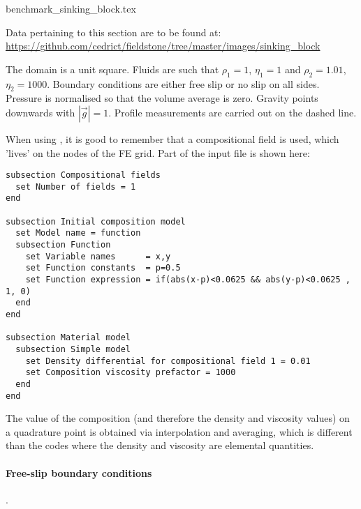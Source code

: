 \begin{flushright} {\tiny {\color{gray} benchmark\_sinking\_block.tex}} \end{flushright}

\vspace{1cm}
\begin{flushright}
Data pertaining to this section are to be found at:
\url{https://github.com/cedrict/fieldstone/tree/master/images/sinking_block}
\end{flushright}
\vspace{1cm}

The domain is a unit square. Fluids are such that 
$\rho_1=1$, $\eta_1=1$ and $\rho_2=1.01$, $\eta_2=1000$.
Boundary conditions are either free slip or no slip on all sides. 
Pressure is normalised so that the volume average is zero. 
Gravity points downwards with $|\vec{g}|=1$.
Profile measurements are carried out on the dashed line.

\begin{center}

\end{center}

When using \aspect{}, it is good to remember that a compositional field is used, 
which 'lives' on the nodes of the FE grid. Part of the input file is shown here: 

\begin{verbatim}
subsection Compositional fields
  set Number of fields = 1 
end 

subsection Initial composition model
  set Model name = function
  subsection Function
    set Variable names      = x,y 
    set Function constants  = p=0.5
    set Function expression = if(abs(x-p)<0.0625 && abs(y-p)<0.0625 , 1, 0)
  end 
end

subsection Material model
  subsection Simple model
    set Density differential for compositional field 1 = 0.01
    set Composition viscosity prefactor = 1000
  end 
end
\end{verbatim}

The value of the composition (and therefore 
the density and viscosity values) on a quadrature point is obtained via interpolation 
and averaging, which is different than the \stone codes where the density 
and viscosity are elemental quantities.


\newpage
\paragraph{Free-slip boundary conditions}.

